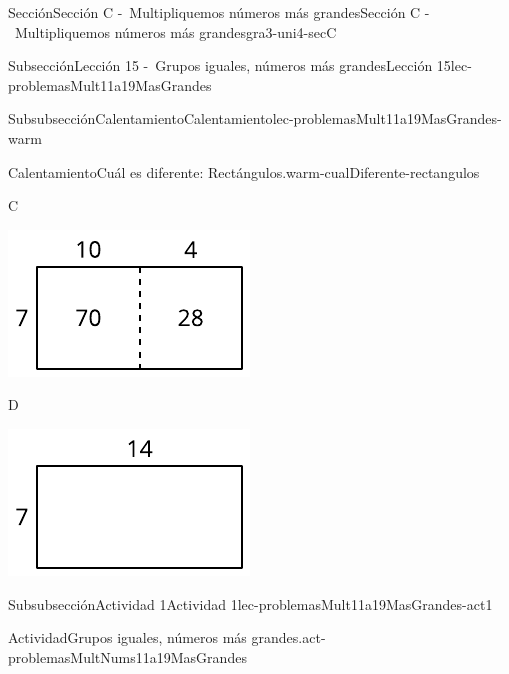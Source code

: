 \documentclass[twoside,10pt,]{article}
\begin{document}
\begin{sectionptx}{Sección}{Sección C -~Multipliquemos números más grandes}{}{Sección C -~Multipliquemos números más grandes}{}{}{gra3-uni4-secC}
\begin{subsectionptx}{Subsección}{Lección 15 -~Grupos iguales, números más grandes}{}{Lección 15}{}{}{lec-problemasMult11a19MasGrandes}
\begin{subsubsectionptx}{Subsubsección}{Calentamiento}{}{Calentamiento}{}{}{lec-problemasMult11a19MasGrandes-warm}
\begin{exploration}{Calentamiento}{Cuál es diferente: Rectángulos.}{warm-cualDiferente-rectangulos}
\begin{sidebyside}{2}{0}{0}{0}
\begin{sbspanel}{0.5}%
C%
\par
\includegraphics[width=\linewidth]{external/svg-source/tikz-file-149352-scale13.pdf}
\end{sbspanel}%
\begin{sbspanel}{0.5}%
D%
\par
\includegraphics[width=\linewidth]{external/svg-source/tikz-file-149353-scale13.pdf}
\end{sbspanel}%
\end{sidebyside}%
\end{exploration}%
\end{subsubsectionptx}
%
%
\typeout{************************************************}
\typeout{************************************************}
%
\begin{subsubsectionptx}{Subsubsección}{Actividad 1}{}{Actividad 1}{}{}{lec-problemasMult11a19MasGrandes-act1}
\begin{activity}{Actividad}{Grupos iguales, números más grandes.}{act-problemasMultNums11a19MasGrandes}%

\end{activity}
\end{subsubsectionptx}
\end{subsectionptx}
\end{sectionptx}
\end{document}
